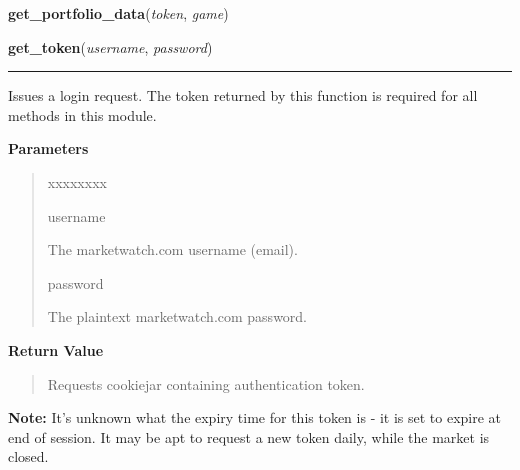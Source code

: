     \vspace{0.5ex}

\hspace{.8\funcindent}\begin{boxedminipage}{\funcwidth}

    \raggedright \textbf{get\_portfolio\_data}(\textit{token}, \textit{game})

\setlength{\parskip}{2ex}
\setlength{\parskip}{1ex}
    \end{boxedminipage}

    \label{moira:get_token}

    \vspace{0.5ex}

\hspace{.8\funcindent}\begin{boxedminipage}{\funcwidth}

    \raggedright \textbf{get\_token}(\textit{username}, \textit{password})

    \vspace{-1.5ex}

    \rule{\textwidth}{0.5\fboxrule}
\setlength{\parskip}{2ex}
    Issues a login request. The token returned by this function is required
    for all methods in this module.

\setlength{\parskip}{1ex}
      \textbf{Parameters}
      \vspace{-1ex}

      \begin{quote}
        \begin{Ventry}{xxxxxxxx}

          \item[username]

          The marketwatch.com username (email).

          \item[password]

          The plaintext marketwatch.com password.

        \end{Ventry}

      \end{quote}

      \textbf{Return Value}
    \vspace{-1ex}

      \begin{quote}
      Requests cookiejar containing authentication token.

      \end{quote}

\textbf{Note:} It's unknown what the expiry time for this token is - it is set to expire 
at end of session. It may be apt to request a new token daily, while the 
market is closed.



    \end{boxedminipage}

